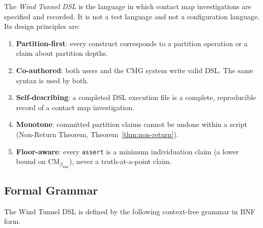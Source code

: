 \documentclass[12pt,a4paper,twocolumn]{article}
\theoremstyle{plain}
\theoremstyle{definition}
\theoremstyle{remark}
\newcommand{\CM}{\mathrm{CM}}
\newcommand{\bmin}{\beta_{\min}}
\newcommand{\CMbmin}{\CM_{\bmin}}
\begin{document}
The \emph{Wind Tunnel DSL} is the language in which contact map
investigations are specified and recorded.  It is not a test language and not
a configuration language.  Its design principles are:

\begin{enumerate}[label=(\roman*)]
  \item \textbf{Partition-first}: every construct corresponds to a partition
    operation or a claim about partition depths.
  \item \textbf{Co-authored}: both users and the CMG system write valid DSL.
    The same syntax is used by both.
  \item \textbf{Self-describing}: a completed DSL execution file is a
    complete, reproducible record of a contact map investigation.
  \item \textbf{Monotone}: committed partition claims cannot be undone within
    a script (Non-Return Theorem, Theorem~\ref{thm:non-return}).
  \item \textbf{Floor-aware}: every \texttt{assert} is a minimum individuation
    claim (a lower bound on $\CMbmin$), never a truth-at-a-point claim.
\end{enumerate}

\subsection{Formal Grammar}

The Wind Tunnel DSL is defined by the following context-free grammar in BNF
form.
\end{document}
